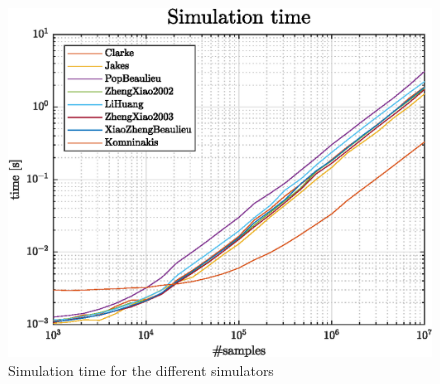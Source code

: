 \begin{figure}
	\centering
	\includegraphics[width=.6\linewidth]{img/simTime.eps}
	
	\caption{Simulation time for the different simulators}
	\label{fig:simTime}
\end{figure}